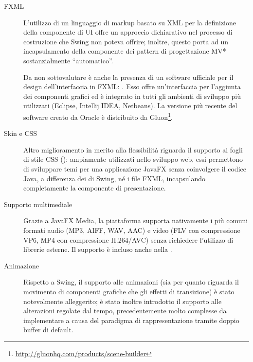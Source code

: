             \begin{description}
                \item [FXML]\label{itm:fxml}
                    L'utilizzo di un linguaggio di markup basato su XML per la definizione della componente di UI offre un approccio dichiarativo nel processo di costruzione che Swing non poteva offrire;
                    inoltre, questo porta ad un incapsulamento della componente  dei pattern di progettazione MV* sostanzialmente ``automatico''.

                    Da non sottovalutare è anche la presenza di un software ufficiale per il design dell'interfaccia in FXML:
                    .
                    Esso offre un'interfaccia  per l'aggiunta dei componenti grafici ed è integrato in tutti gli ambienti di sviluppo più utilizzati (Eclipse, Intellij IDEA, Netbeans).
                    La versione più recente del software creato da Oracle è distribuito da Gluon\footnote{\url{http://gluonhq.com/products/scene-builder}}.

                \item[Skin e CSS]\label{itm:css}
                    Altro miglioramento in merito alla flessibilità riguarda il supporto ai fogli di stile CSS ():
                    ampiamente utilizzati nello sviluppo web, essi permettono di sviluppare temi per una applicazione JavaFX senza coinvolgere il codice Java, a differenza dei  di Swing, né i file FXML, incapsulando completamente la componente di presentazione.

                \item[Supporto multimediale]\label{itm:media}
                    Grazie a JavaFX Media, la piattaforma supporta nativamente i più comuni formati audio (MP3, AIFF, WAV, AAC) e video (FLV con compressione VP6, MP4 con compressione H.264/AVC) senza richiedere l'utilizzo di librerie esterne.
                    Il supporto è incluso anche nella .

                \item[Animazione]\label{itm:anim}
                    Rispetto a Swing, il supporto alle animazioni (sia per quanto riguarda il movimento di componenti grafiche che gli effetti di transizione) è stato notevolmente alleggerito;
                    è stato inoltre introdotto il supporto alle alterazioni regolate dal tempo, precedentemente molto complesse da implementare a causa del paradigma di rappresentazione tramite doppio buffer di default.


\end{description}
